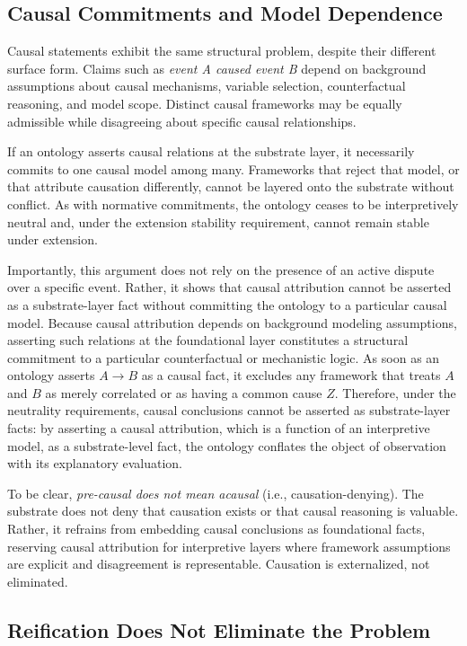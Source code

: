 \subsection{Causal Commitments and Model Dependence}
\label{subsec:causal}

Causal statements exhibit the same structural problem,
despite their different surface form.
Claims such as \textit{event A caused event B}
depend on background assumptions about causal mechanisms,
variable selection, counterfactual reasoning, and model scope.
Distinct causal frameworks may be equally admissible
while disagreeing about specific causal relationships.

If an ontology asserts causal relations at the substrate layer,
it necessarily commits to one causal model among many.
Frameworks that reject that model,
or that attribute causation differently,
cannot be layered onto the substrate without conflict.
As with normative commitments,
the ontology ceases to be interpretively neutral and,
under the extension stability requirement,
cannot remain stable under extension.

Importantly, this argument does not rely on
the presence of an active dispute over a specific event.
Rather, it shows that causal attribution
cannot be asserted as a substrate-layer fact
without committing the ontology
to a particular causal model.
Because causal attribution depends on background modeling assumptions,
asserting such relations at the foundational layer
constitutes a structural commitment
to a particular counterfactual or mechanistic logic.
As soon as an ontology asserts $A \to B$ as a causal fact,
it excludes any framework that treats $A$ and $B$
as merely correlated or as having a common cause $Z$.
Therefore, under the neutrality requirements,
causal conclusions cannot be asserted as substrate-layer facts:
by asserting a causal attribution,
which is a function of an interpretive model,
as a substrate-level fact,
the ontology conflates the object of observation
with its explanatory evaluation.

To be clear, \textit{pre-causal does not mean acausal}
(i.e., causation-denying).
The substrate does not deny that causation exists
or that causal reasoning is valuable.
Rather, it refrains from embedding causal conclusions
as foundational facts,
reserving causal attribution for interpretive layers
where framework assumptions are explicit
and disagreement is representable.
Causation is externalized, not eliminated.

\subsection{Reification Does Not Eliminate the Problem}
\label{subsec:reification}

